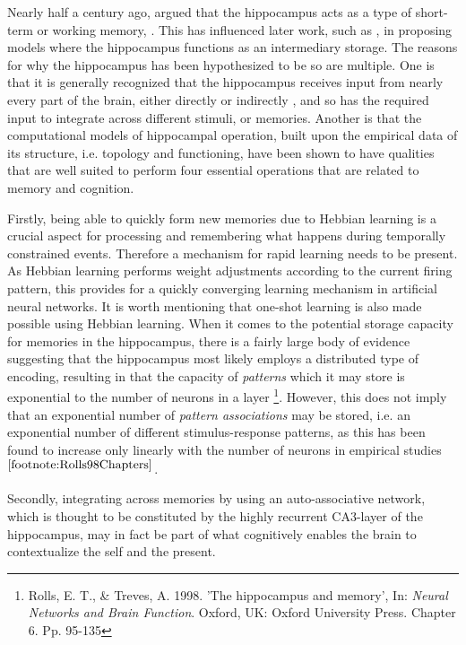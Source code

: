 
Nearly half a century ago, \cite{Marr1971} argued that the hippocampus acts as a type of short-term or working memory, \citep{Rolls1998chpt6}. This has influenced later work, such as \citep{McClelland1995}, in proposing models where the hippocampus functions as an intermediary storage. The reasons for why the hippocampus has been hypothesized to be so are multiple. One is that it is generally recognized that the hippocampus receives input from nearly every part of the brain, either directly or indirectly \citep{Rolls1998chpt1}, and so has the required input to integrate across different stimuli, or memories. Another is that the computational models of hippocampal operation, built upon the empirical data of its structure, i.e. topology and functioning, have been shown to have qualities that are well suited to perform four essential operations that are related to memory and cognition.

Firstly, being able to quickly form new memories due to Hebbian learning is a crucial aspect for processing and remembering what happens during temporally constrained events. Therefore a mechanism for rapid learning needs to be present. As Hebbian learning performs weight adjustments according to the current firing pattern, this provides for a quickly converging learning mechanism in artificial neural networks. It is worth mentioning that one-shot learning is also made possible using Hebbian learning. 
When it comes to the potential storage capacity for memories in the hippocampus, there is a fairly large body of evidence suggesting that the hippocampus most likely employs a distributed type of encoding, resulting in that the capacity of \textit{patterns} which it may store is exponential to the number of neurons in a layer
\footnote{\label{footnote:Rolls98Chapters}Rolls, E. T., \& Treves, A. 1998. 'The hippocampus and memory', In: \textit{Neural Networks and Brain Function}. Oxford, UK: Oxford University Press. Chapter 6. Pp. 95-135}. However, this does not imply that an exponential number of \textit{pattern associations} may be stored, i.e. an exponential number of different stimulus-response patterns, as this has been found to increase only linearly with the number of neurons in empirical studies$^{\ref{footnote:Rolls98Chapters}}$.

Secondly, integrating across memories by using an auto-associative network, which is thought to be constituted by the highly recurrent CA3-layer of the hippocampus, may in fact be part of what cognitively enables the brain to contextualize the self and the present.

